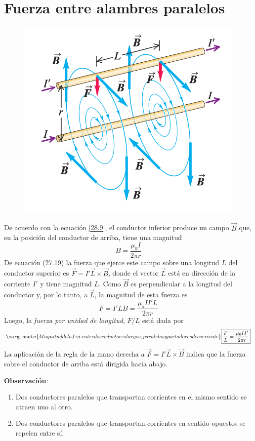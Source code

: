 \section{Fuerza entre alambres paralelos}
\begin{figure}[h]\label{fig2}
\includegraphics[scale=0.6]{fig/image2}
\centering
\end{figure}
De acuerdo con la ecuación \ref{28.9}, el conductor inferior produce un campo $\vec{B}$ que, en la posición del conductor de arriba, tiene una magnitud $$B=\frac{\mu_0I}{2\pi r}$$ De ecuación (27.19) la fuerza que ejerce este campo sobre una longitud $L$ del conductor superior es $\vec{F}=I' \vec{L}\times\vec{B}$,  donde el vector $\vec{L}$ está en dirección de la corriente $I'$ y tiene magnitud $L$. Como $\vec{B}$ es perpendicular a la longitud del conductor y, por lo tanto, a $\vec{L}$, la magnitud de esta fuerza es $$F=I'LB=\frac{\mu_oII'L}{2\pi r}$$ Luego, la \textit{fuerza por unidad de longitud}, $F/L$ está dada por
\begin{equation}\label{28.11}\marginnote{Magnitud de la fza. entre dos coductores largos, paralelos y portadores de
corriente}
\boxed{\frac{F}{L}=\frac{\mu_0II'}{2\pi r}}
\end{equation}
La aplicación de la regla de la mano derecha a $\vec{F}=I'\vec{L}\times\vec{B}$ indica que la fuerza sobre el conductor de arriba está dirigida hacia abajo.

\textbf{Observación}:
\begin{enumerate}
\item Dos conductores paralelos que transportan corrientes en el mismo sentido se atraen uno al otro.
\item Dos conductores paralelos que transportan corrientes en sentido opuestos se repelen entre sí.
\end{enumerate}
